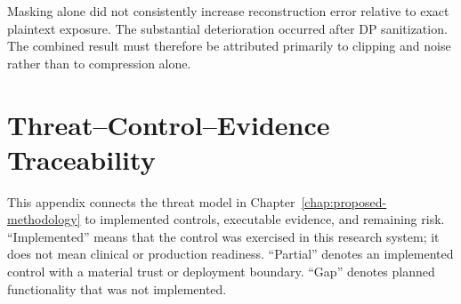 Masking alone did not consistently increase reconstruction error relative to exact plaintext exposure. The substantial deterioration occurred after DP sanitization. The combined result must therefore be attributed primarily to clipping and noise rather than to compression alone.


\chapter{Threat--Control--Evidence Traceability}
\label{app:security-traceability}

This appendix connects the threat model in Chapter~\ref{chap:proposed-methodology} to implemented controls, executable evidence, and remaining risk. ``Implemented'' means that the control was exercised in this research system; it does not mean clinical or production readiness. ``Partial'' denotes an implemented control with a material trust or deployment boundary. ``Gap'' denotes planned functionality that was not implemented.

